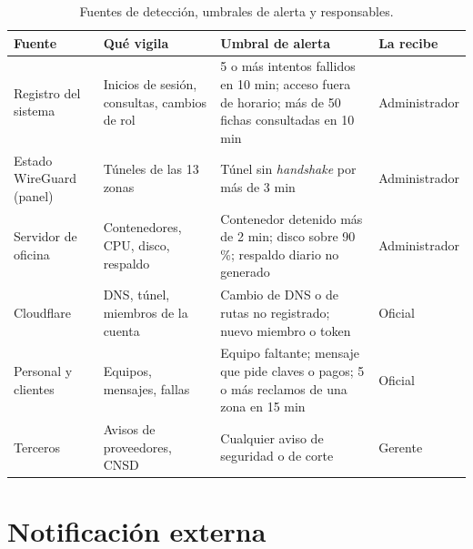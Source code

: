 \begin{table}[H]
\centering
\caption{Fuentes de detección, umbrales de alerta y responsables.}
\label{tab:anx-inc-ioc}
\small
\begin{tabularx}{\textwidth}{L{2.8cm}L{3.2cm}XL{1.8cm}}
\toprule
\textbf{Fuente} & \textbf{Qué vigila} & \textbf{Umbral de alerta} & \textbf{La recibe} \\
\midrule
Registro del sistema & Inicios de sesión, consultas, cambios de rol & 5 o más intentos fallidos en 10 min; acceso fuera de horario; más de 50 fichas consultadas en 10 min & Administrador \\
Estado WireGuard (panel) & Túneles de las 13 zonas & Túnel sin \emph{handshake} por más de 3 min & Administrador \\
Servidor de oficina & Contenedores, CPU, disco, respaldo & Contenedor detenido más de 2 min; disco sobre 90\,\%; respaldo diario no generado & Administrador \\
Cloudflare & DNS, túnel, miembros de la cuenta & Cambio de DNS o de rutas no registrado; nuevo miembro o token & Oficial \\
Personal y clientes & Equipos, mensajes, fallas & Equipo faltante; mensaje que pide claves o pagos; 5 o más reclamos de una zona en 15 min & Oficial \\
Terceros & Avisos de proveedores, CNSD & Cualquier aviso de seguridad o de corte & Gerente \\
\bottomrule
\end{tabularx}
\end{table}

\section{Notificación externa}


